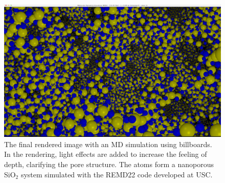 \begin{figure}[h]
\begin{center}
\includegraphics[width=\textwidth, trim=0cm 0cm 0cm 0cm, clip]{visualization/figures/billboards_md_visualization.png}
\end{center}
\caption{The final rendered image with an MD simulation using billboards. In the rendering, light effects are added to increase the feeling of depth, clarifying the pore structure. The atoms form a nanoporous SiO$_2$ system simulated with the REMD22 code developed at USC.}
\label{fig:visualization_billboard_md}
\end{figure}

